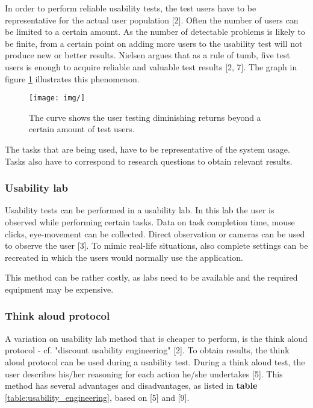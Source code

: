In order to perform reliable usability tests, the test users have to be representative for the actual user population [2]. Often the number of users can be limited to a certain amount. As the number of detectable problems is likely to be finite, from a certain point on adding more users to the usability test will not produce new or better results. Nielsen argues that as a rule of tumb, five test users is enough to acquire reliable and valuable test results [2, 7]. The graph in figure \ref{figure:diminishing_returns} illustrates this phenomenon.

\begin{figure}
	\begin{center}
		\texttt{[image: img/]}
		\caption{The curve shows the user testing diminishing returns beyond a certain amount of test users.}
		\label{figure:diminishing_returns}
	\end{center}
\end{figure}


The tasks that are being used, have to be representative of the system usage. Tasks also have to correspond to research questions to obtain relevant results.


\subsubsection{Usability lab}

Usability tests can be performed in a usability lab. In this lab the user is observed while performing certain tasks. Data on task completion time, mouse clicks, eye-movement can be collected. Direct observation or cameras can be used to observe the user [3]. To mimic real-life situations, also complete settings can be recreated in which the users would normally use the application.

This method can be rather costly, as labs need to be available and the required equipment may be expensive.


\subsubsection{Think aloud protocol}

A variation on usability lab method that is cheaper to perform, is the think aloud protocol - cf. "discount usability engineering" [2]. To obtain results, the think aloud protocol can be used during a usability test. During a think aloud test, the user describes his/her reasoning for each action he/she undertakes [5]. This method has several advantages and disadvantages, as listed in \textbf{table} \ref{table:usability_engineering}, based on [5] and [9].

